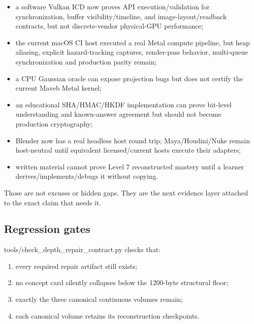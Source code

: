 \begin{itemize}
\tightlist
\item
  a software Vulkan ICD now proves API execution/validation for synchronization, buffer visibility/timeline, and image-layout/readback contracts, but not discrete-vendor physical-GPU performance;
\item
  the current macOS CI host executed a real Metal compute pipeline, but heap aliasing, explicit hazard-tracking captures, render-pass behavior, multi-queue synchronization and production parity remain;
\item
  a CPU Gaussian oracle can expose projection bugs but does not certify the current Maveb Metal kernel;
\item
  an educational SHA/HMAC/HKDF implementation can prove bit-level understanding and known-answer agreement but should not become production cryptography;
\item
  Blender now has a real headless host round trip; Maya/Houdini/Nuke remain host-neutral until equivalent licensed/current hosts execute their adapters;
\item
  written material cannot prove Level 7 reconstructed mastery until a learner derives/implements/debugs it without copying.
\end{itemize}

Those are not excuses or hidden gaps. They are the next evidence layer attached to the exact claim that needs it.

\subsection{Regression gates}\label{appendix-2358b21a702d-regression-gates}

\hypertarget{appendix-2358b21a702d-regression-gates}{}

tools/check\_depth\_repair\_contract.py checks that:

\begin{enumerate}
\def\labelenumi{\arabic{enumi}.}
\tightlist
\item
  every required repair artifact still exists;
\item
  no concept card silently collapses below the 1200-byte structural floor;
\item
  exactly the three canonical continuous volumes remain;
\item
  each canonical volume retains its reconstruction checkpoints.
\end{enumerate}

